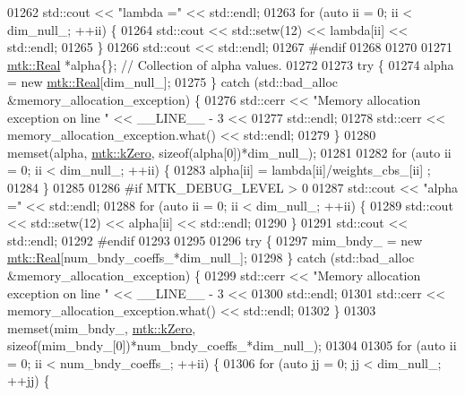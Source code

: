 \begin{DoxyCode}
{{01262   std::cout << \textcolor{stringliteral}{"lambda ="} << std::endl;
01263   \textcolor{keywordflow}{for} (\textcolor{keyword}{auto} ii = 0; ii < dim\_null\_; ++ii) \{
01264     std::cout << std::setw(12) << lambda[ii] << std::endl;
01265   \}
01266   std::cout << std::endl;
01267 \textcolor{preprocessor}{  #endif}
01268 
01270 
01271   \hyperlink{group__c01-roots_gac080bbbf5cbb5502c9f00405f894857d}{mtk::Real} *alpha\{\}; \textcolor{comment}{// Collection of alpha values.}
01272 
01273   \textcolor{keywordflow}{try} \{
01274     alpha = \textcolor{keyword}{new} \hyperlink{group__c01-roots_gac080bbbf5cbb5502c9f00405f894857d}{mtk::Real}[dim\_null\_];
01275   \} \textcolor{keywordflow}{catch} (std::bad\_alloc &memory\_allocation\_exception) \{
01276     std::cerr << \textcolor{stringliteral}{"Memory allocation exception on line "} << \_\_LINE\_\_ - 3 <<
01277       std::endl;
01278     std::cerr << memory\_allocation\_exception.what() << std::endl;
01279   \}
01280   memset(alpha, \hyperlink{group__c01-roots_ga59a451a5fae30d59649bcda274fea271}{mtk::kZero}, \textcolor{keyword}{sizeof}(alpha[0])*dim\_null\_);
01281 
01282   \textcolor{keywordflow}{for} (\textcolor{keyword}{auto} ii = 0; ii < dim\_null\_; ++ii) \{
01283     alpha[ii] = lambda[ii]/weights\_cbs\_[ii] ;
01284   \}
01285 
01286 \textcolor{preprocessor}{  #if MTK\_DEBUG\_LEVEL > 0}
01287   std::cout << \textcolor{stringliteral}{"alpha ="} << std::endl;
01288   \textcolor{keywordflow}{for} (\textcolor{keyword}{auto} ii = 0; ii < dim\_null\_; ++ii) \{
01289     std::cout << std::setw(12) << alpha[ii] << std::endl;
01290   \}
01291   std::cout << std::endl;
01292 \textcolor{preprocessor}{  #endif}
01293 
01295 
01296   \textcolor{keywordflow}{try} \{
01297     mim\_bndy\_ = \textcolor{keyword}{new} \hyperlink{group__c01-roots_gac080bbbf5cbb5502c9f00405f894857d}{mtk::Real}[num\_bndy\_coeffs\_*dim\_null\_];
01298   \} \textcolor{keywordflow}{catch} (std::bad\_alloc &memory\_allocation\_exception) \{
01299     std::cerr << \textcolor{stringliteral}{"Memory allocation exception on line "} << \_\_LINE\_\_ - 3 <<
01300       std::endl;
01301     std::cerr << memory\_allocation\_exception.what() << std::endl;
01302   \}
01303   memset(mim\_bndy\_, \hyperlink{group__c01-roots_ga59a451a5fae30d59649bcda274fea271}{mtk::kZero}, \textcolor{keyword}{sizeof}(mim\_bndy\_[0])*num\_bndy\_coeffs\_*dim\_null\_);
01304 
01305   \textcolor{keywordflow}{for} (\textcolor{keyword}{auto} ii = 0; ii < num\_bndy\_coeffs\_; ++ii) \{
01306     \textcolor{keywordflow}{for} (\textcolor{keyword}{auto} jj = 0; jj < dim\_null\_; ++jj) \{
}}
\end{DoxyCode}

